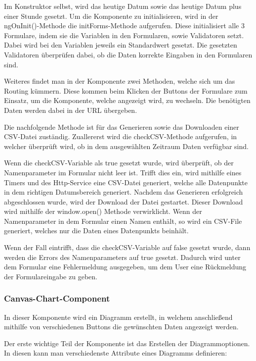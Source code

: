 Im Konstruktor selbst, wird das heutige Datum sowie das heutige Datum plus einer Stunde gesetzt.
Um die Komponente zu initialisieren, wird in der ngOnInit()-Methode die initForms-Methode aufgerufen. Diese initialisiert alle 3 Formulare, indem sie die Variablen in den Formularen, sowie Validatoren setzt. Dabei wird bei den Variablen jeweils ein Standardwert gesetzt. Die gesetzten Validatoren überprüfen dabei, ob die Daten korrekte Eingaben in den Formularen sind.
 
Weiteres findet man in der Komponente zwei Methoden, welche sich um das Routing kümmern. Diese kommen beim Klicken der Buttons der Formulare zum Einsatz, um die Komponente, welche angezeigt wird, zu wechseln. Die benötigten Daten werden dabei in der URL übergeben.
 
Die nachfolgende Methode ist für das Generieren sowie das Downloaden einer CSV-Datei zuständig. Zuallererst wird die checkCSV-Methode aufgerufen, in welcher überprüft wird, ob in dem ausgewählten Zeitraum Daten verfügbar sind.
 
Wenn die checkCSV-Variable als true gesetzt wurde, wird überprüft, ob der Namenparameter im Formular nicht leer ist. Trifft dies ein, wird mithilfe eines Timers und des Http-Service eine CSV-Datei generiert, welche alle Datenpunkte in dem richtigen Datumsbereich generiert. Nachdem das Generieren erfolgreich abgeschlossen wurde, wird der Download der Datei gestartet. Dieser Download wird mithilfe der window.open() Methode verwirklicht. Wenn der Namenparameter in dem Formular einen Namen enthält, so wird ein CSV-File generiert, welches nur die Daten eines Datenpunkts beinhält.
 
Wenn der Fall eintrifft, dass die checkCSV-Variable auf false gesetzt wurde, dann werden die Errors des Namenparameters auf true gesetzt. Dadurch wird unter dem Formular eine Fehlermeldung ausgegeben, um dem User eine Rückmeldung der Formulareingabe zu geben.
 
\subsubsection{Canvas-Chart-Component}
 
In dieser Komponente wird ein Diagramm erstellt, in welchem anschließend mithilfe von verschiedenen Buttons die gewünschten Daten angezeigt werden. 
 
Der erste wichtige Teil der Komponente ist das Erstellen der Diagrammoptionen. In diesen kann man verschiedenste Attribute eines Diagramms definieren:
 
